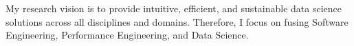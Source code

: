 \documentclass[11pt, a4paper]{andre-bewerbung}
\begin{document}


\makecvheader[C]
\makecvfooter{}

\vspace{0.5cm}


\begin{cvtext}
    My research vision is to provide intuitive, efficient, and sustainable data science solutions across all disciplines and domains. Therefore, I focus on fusing Software Engineering, Performance Engineering, and Data Science.
\end{cvtext}



\vspace{-5mm}










\vspace{2.5mm}




\end{document}
